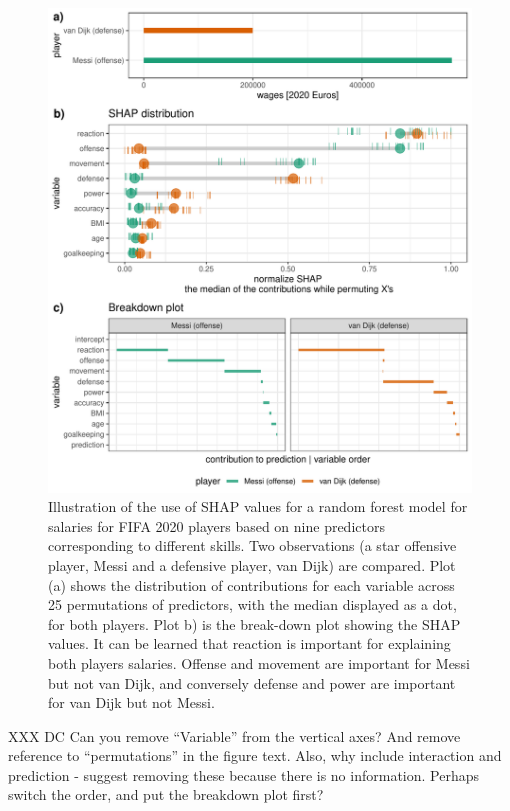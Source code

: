\documentclass[
]{article}
\begin{document}
\begin{figure}

{\centering \includegraphics[width=25in]{./figures/shap_distr_bd} 

}

\caption{Illustration of the use of SHAP values for a random forest model for salaries for FIFA 2020 players based on nine predictors corresponding to different skills. Two observations (a star offensive player, Messi and a defensive player, van Dijk) are compared. Plot (a) shows the distribution of contributions for each variable across 25 permutations of predictors, with the median displayed as a dot, for both players. Plot b) is the break-down plot showing the SHAP values. It can be learned that reaction is important for explaining both players salaries. Offense and movement are important for Messi but not van Dijk, and conversely defense and power are important for van Dijk but not Messi.}\label{fig:shapdistrbd}
\end{figure}

XXX DC Can you remove ``Variable'' from the vertical axes? And remove
reference to ``permutations'' in the figure text. Also, why include
interaction and prediction - suggest removing these because there is no
information. Perhaps switch the order, and put the breakdown plot first?
\end{document}
